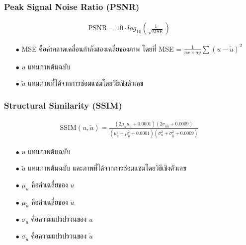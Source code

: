 \documentclass[xcolor=dvipsnames, xetex,serif]{beamer}
\numberwithin{equation}{section}
\begin{document}
		\begin{frame}
			\frametitle{Peak Signal Noise Ratio (PSNR)}
			\begin{align*}
			\text{PSNR}  = 10 \cdot log_{10} ( \frac{1}{\sqrt{\text{MSE}}} )
			\end{align*}
			\begin{itemize}
				\item[$\bullet$] MSE คือค่าคลาดเคลื่อนกำลังสองเฉลี่ยของภาพ โดยที่ MSE = $\frac{1}{nx \times ny} \sum (u - \tilde{u})^2 $
				\item[$\bullet$] $u$ แทนภาพต้นฉบับ
				\item[$\bullet$] $\tilde{u}$  แทนภาพที่ได้จากการซ่อมแซมโดยวิธีเชิงตัวเลข
			\end{itemize}
		\end{frame}
		\begin{frame}
			\frametitle{Structural Similarity (SSIM)}
			\begin{align*}
			\text{SSIM}(u,\tilde{u}) = \frac{(2\mu_u\mu_{\tilde{u}} + 0.0001)(2\sigma_{u\tilde{u}} + 0.0009)}{(\mu_u^2+\mu_{\tilde{u}}^2+0.0001)(\sigma_u^2+\sigma_{\tilde{u}}^2+0.0009)}
			\end{align*}
			\begin{itemize}
				\item[$\bullet$] $u$ แทนภาพต้นฉบับ
				\item[$\bullet$] $\tilde{u}$  แทนภาพต้นฉบับ และภาพที่ได้จากการซ่อมแซมโดยวิธีเชิงตัวเลข
				\item[$\bullet$] $\mu_u$ คือค่าเฉลี่ยของ $u$
				\item[$\bullet$] $\mu_{\tilde{u}}$ คือค่าเฉลี่ยของ $\tilde{u}$
				\item[$\bullet$]  $\sigma_u$ คือความแปรปรวนของ $u$ 
				\item[$\bullet$] $\sigma_{\tilde{u}}$ คือความแปรปรวนของ $\tilde{u}$
			\end{itemize}
		\end{frame}
\end{document}
